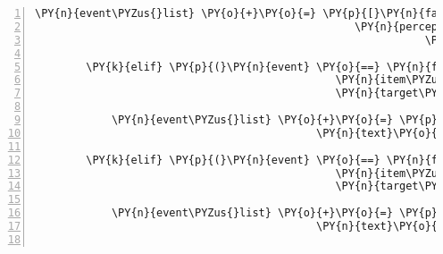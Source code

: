 \begin{Verbatim}[commandchars=\\\{\},numbers=left,firstnumber=1,stepnumber=1]
            \PY{n}{event\PYZus{}list} \PY{o}{+}\PY{o}{=} \PY{p}{[}\PY{n}{fabula}\PY{o}{.}\PY{n}{PerceptionEvent}\PY{p}{(}\PY{n}{identifier}\PY{o}{=}\PY{n}{ID\PYZus{}KUNI}\PY{p}{,}
                                                  \PY{n}{perception}\PY{o}{=}\PY{l+s}{\PYZsq{}}\PY{l+s}{Ein Harfe\PYZhy{}spielender Elf. }\PY{l+s}{\PYZsq{}}
                                                             \PY{l+s}{\PYZsq{}}\PY{l+s}{Der sieht ein bisschen unglücklich aus.}\PY{l+s}{\PYZsq{}}\PY{p}{)}\PY{p}{]}

        \PY{k}{elif} \PY{p}{(}\PY{n}{event} \PY{o}{==} \PY{n}{fabula}\PY{o}{.}\PY{n}{TriesToDropEvent}\PY{p}{(}\PY{n}{identifier}\PY{o}{=}\PY{n}{ID\PYZus{}KUNI}\PY{p}{,}
                                               \PY{n}{item\PYZus{}identifier}\PY{o}{=}\PY{l+s}{\PYZsq{}}\PY{l+s}{goblet}\PY{l+s}{\PYZsq{}}\PY{p}{,}
                                               \PY{n}{target\PYZus{}identifier}\PY{o}{=}\PY{l+s}{\PYZsq{}}\PY{l+s}{elf}\PY{l+s}{\PYZsq{}}\PY{p}{)}\PY{p}{)}\PY{p}{:}

            \PY{n}{event\PYZus{}list} \PY{o}{+}\PY{o}{=} \PY{p}{[}\PY{n}{fabula}\PY{o}{.}\PY{n}{SaysEvent}\PY{p}{(}\PY{n}{identifier}\PY{o}{=}\PY{l+s}{\PYZsq{}}\PY{l+s}{elf}\PY{l+s}{\PYZsq{}}\PY{p}{,}
                                            \PY{n}{text}\PY{o}{=}\PY{l+s}{\PYZsq{}}\PY{l+s}{Was soll ich mit einem leeren Kelch?}\PY{l+s}{\PYZsq{}}\PY{p}{)}\PY{p}{]}

        \PY{k}{elif} \PY{p}{(}\PY{n}{event} \PY{o}{==} \PY{n}{fabula}\PY{o}{.}\PY{n}{TriesToDropEvent}\PY{p}{(}\PY{n}{identifier}\PY{o}{=}\PY{n}{ID\PYZus{}KUNI}\PY{p}{,}
                                               \PY{n}{item\PYZus{}identifier}\PY{o}{=}\PY{l+s}{\PYZsq{}}\PY{l+s}{dew}\PY{l+s}{\PYZsq{}}\PY{p}{,}
                                               \PY{n}{target\PYZus{}identifier}\PY{o}{=}\PY{l+s}{\PYZsq{}}\PY{l+s}{elf}\PY{l+s}{\PYZsq{}}\PY{p}{)}\PY{p}{)}\PY{p}{:}

            \PY{n}{event\PYZus{}list} \PY{o}{+}\PY{o}{=} \PY{p}{[}\PY{n}{fabula}\PY{o}{.}\PY{n}{SaysEvent}\PY{p}{(}\PY{n}{identifier}\PY{o}{=}\PY{l+s}{\PYZsq{}}\PY{l+s}{elf}\PY{l+s}{\PYZsq{}}\PY{p}{,}
                                            \PY{n}{text}\PY{o}{=}\PY{l+s}{\PYZsq{}}\PY{l+s}{Hach, ich habs doch schon schwer genug.}\PY{l+s}{\PYZsq{}}\PY{p}{)}\PY{p}{]}


\end{Verbatim}
